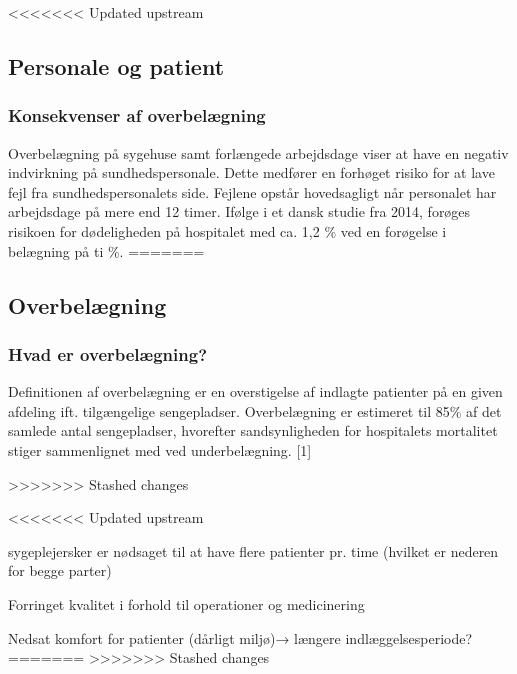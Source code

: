 <<<<<<< Updated upstream
\subsection{Personale og patient}

\subsubsection{Konsekvenser af overbelægning}

Overbelægning på sygehuse samt forlængede arbejdsdage viser at have en negativ indvirkning på sundhedspersonale. Dette medfører en forhøget risiko for at lave fejl fra sundhedspersonalets side. Fejlene opstår hovedsagligt når personalet har arbejdsdage på mere end 12 timer. Ifølge i et dansk studie fra 2014, forøges risikoen for dødeligheden på hospitalet med ca. 1,2 \% ved en forøgelse i belægning på ti \%.
=======
\subsection{Overbelægning}
\subsubsection{Hvad er overbelægning?}
Definitionen af overbelægning er en overstigelse af indlagte patienter på en given afdeling ift. tilgængelige sengepladser. Overbelægning er estimeret til 85\% af det samlede antal sengepladser, hvorefter sandsynligheden for hospitalets mortalitet  stiger sammenlignet med ved underbelægning. [1]


>>>>>>> Stashed changes




<<<<<<< Updated upstream



sygeplejersker er nødsaget til at have flere patienter pr. time (hvilket er nederen for begge parter)

Forringet kvalitet i forhold til operationer og medicinering 

Nedsat komfort for patienter (dårligt miljø)→ længere indlæggelsesperiode?
=======
>>>>>>> Stashed changes
